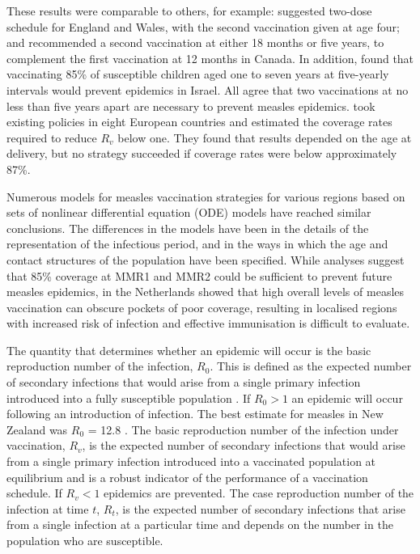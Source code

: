 \documentclass{article}
\begin{document}
These results were comparable to others, for example: \citep{babad95} suggested two-dose schedule for England and Wales, with the second vaccination given at age four; and \citep{gay98} recommended a second vaccination at either 18 months or five years, to complement the first vaccination at 12 months in Canada. In addition, \citep{agur93} found that vaccinating 85\% of susceptible children aged one to seven years at five-yearly intervals would prevent epidemics in Israel. All agree that two vaccinations at no less than five years apart are necessary to prevent measles epidemics. \citep{wallinga1} took existing policies in eight European countries and estimated the coverage rates required to reduce $R_v$ below one. They found that results depended on the age at delivery, but no strategy succeeded if coverage rates were below approximately 87\%.

Numerous models for measles vaccination strategies for various regions \citep{agur93, babad95, edmunds0, gay98, wallinga1} based on sets of nonlinear differential equation (ODE) models have reached similar conclusions. The differences in the models have been in the details of the representation of the infectious period, and in the ways in which the age and contact structures of the population have been specified. While analyses suggest that 85\% coverage at MMR1 and MMR2 could be sufficient to prevent future measles epidemics, \citep{glass4} in the Netherlands showed that high overall levels of measles vaccination can obscure pockets of poor coverage, resulting in localised regions with increased risk of infection and effective immunisation is difficult to evaluate. 

The quantity that determines whether an epidemic will occur is the basic reproduction number of the infection, $R_0$. This is defined as the expected number of secondary infections that would arise from a single primary infection introduced into a fully susceptible population \citep{anderson91, diekmann0}. If $R_0 > 1$ an epidemic will occur following an introduction of infection. The best estimate for measles in New Zealand was $R_0$ = 12.8 \citep{roberts4}. The basic reproduction number of the infection under vaccination, $R_v$, is the expected number of secondary infections that would arise from a single primary infection introduced into a vaccinated population at equilibrium and is a robust indicator of the performance of a vaccination schedule. If $R_v < 1$ epidemics are prevented. The case reproduction number of the infection at time $t$, $R_t$, is the expected number of secondary infections that arise from a single infection at a particular time and depends on the number in the population who are susceptible.
\end{document}

